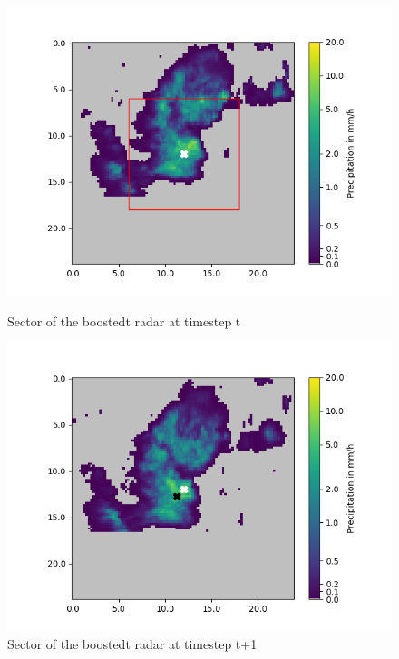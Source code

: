 \documentclass[11pt,twoside,a4paper,fleqn]{report}
\numberwithin{equation}{chapter}
\numberwithin{figure}{chapter}
\numberwithin{table}{chapter}
\begin{document}
\begin{figure}[h]
	\centering
	\begin{minipage}{0.45\textwidth}
		\includegraphics[width=\textwidth,trim={15mm 0 15mm 0},clip]{Displacement_t0.png}
		\caption{Sector of the boostedt radar at timestep t}
		\label{fig:displacement_t0}
	\end{minipage}\hfill
	\begin{minipage}{0.45\textwidth}
		\includegraphics[width=\textwidth,trim={15mm 0 15mm 0},clip]{Displacement_t1.png}
		\caption{Sector of the boostedt radar at timestep t+1}
		\label{fig:displacment_t1}
	\end{minipage}

\end{figure}
\end{document}
